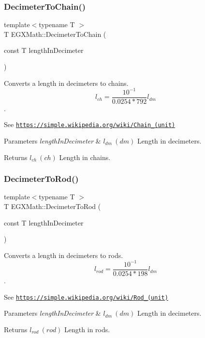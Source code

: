 \subsubsection{\texorpdfstring{Decimeter\+To\+Chain()}{DecimeterToChain()}}
{\footnotesize\ttfamily template$<$typename T $>$ \\
T E\+G\+X\+Math\+::\+Decimeter\+To\+Chain (\begin{DoxyParamCaption}\item[{const T}]{length\+In\+Decimeter }\end{DoxyParamCaption})}



Converts a length in decimeters to chains. \[ l_{ch}= \frac{10^{-1}}{0.0254 * 792} l_{dm} \]. 

See \href{https://simple.wikipedia.org/wiki/Chain_(unit)}{\tt https\+://simple.\+wikipedia.\+org/wiki/\+Chain\+\_\+(unit)} 
\begin{DoxyParams}{Parameters}
{\em length\+In\+Decimeter} & $ l_{dm}\ (dm)$ Length in decimeters. \\
\hline
\end{DoxyParams}
\begin{DoxyReturn}{Returns}
$ l_{ch}\ (ch)$ Length in chains. 
\end{DoxyReturn}
\mbox{\label{group___e_g_x_math-_conversions-_length_conversions-_s_i-_decimeter-_surveyors_gaf34122272f5724db35f8400d284e2ec8}} 
\subsubsection{\texorpdfstring{Decimeter\+To\+Rod()}{DecimeterToRod()}}
{\footnotesize\ttfamily template$<$typename T $>$ \\
T E\+G\+X\+Math\+::\+Decimeter\+To\+Rod (\begin{DoxyParamCaption}\item[{const T}]{length\+In\+Decimeter }\end{DoxyParamCaption})}



Converts a length in decimeters to rods. \[ l_{rod}= \frac{10^{-1}}{0.0254 * 198} l_{dm} \]. 

See \href{https://simple.wikipedia.org/wiki/Rod_(unit)}{\tt https\+://simple.\+wikipedia.\+org/wiki/\+Rod\+\_\+(unit)} 
\begin{DoxyParams}{Parameters}
{\em length\+In\+Decimeter} & $ l_{dm}\ (dm)$ Length in decimeters. \\
\hline
\end{DoxyParams}
\begin{DoxyReturn}{Returns}
$ l_{rod}\ (rod)$ Length in rods. 
\end{DoxyReturn}
